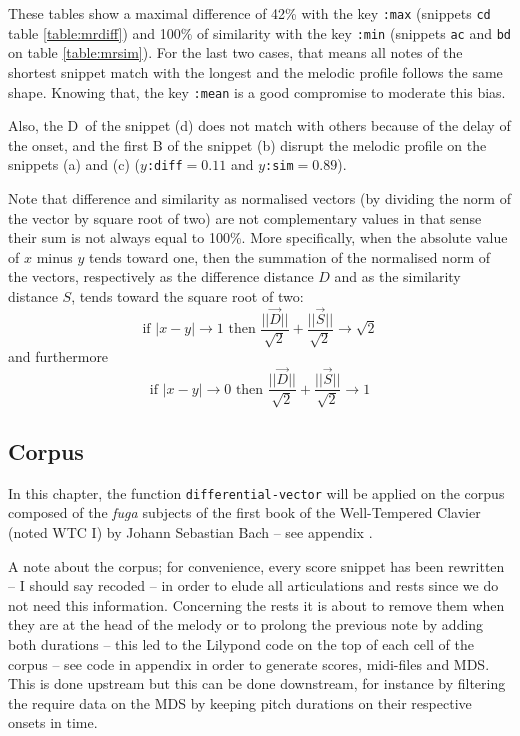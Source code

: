 These tables show a maximal difference of 42\% with the key \texttt{:max} (snippets \texttt{cd} table \ref{table:mrdiff}) and 100\% of similarity with the key \texttt{:min} (snippets \texttt{ac} and \texttt{bd} on table \ref{table:mrsim}).
For the last two cases, that means all notes of the shortest snippet match with the longest and the melodic profile follows the same shape. Knowing that, the key \texttt{:mean} is a good compromise to moderate this bias. 

Also, the \textsf{D}\sh \  of the snippet (d) does not match with others because of the delay of the onset, and the first \textsf{B} of the snippet (b) disrupt the melodic profile on the snippets (a) and (c) ($y$\texttt{:diff}$=0.11$ and $y$\texttt{:sim}$=0.89$).

Note that difference and similarity as normalised vectors (by dividing the norm of the vector by square root of two) are not complementary values in that sense their sum is not always equal to 100\%. More specifically, when the absolute value of $x$ minus $y$ tends toward one, then the summation of the normalised norm of the vectors, respectively as the difference distance $D$ and as the similarity distance $S$, tends toward the square root of two:
$$\text{if } |x-y| \to 1 \text{ then } \frac{||\overrightarrow{D}||}{\sqrt{2}} + \frac{||\overrightarrow{S}||}{\sqrt{2}} \to \sqrt{2}$$
 and furthermore
 $$\text{if } |x-y| \to 0 \text{ then } \frac{||\overrightarrow{D}||}{\sqrt{2}} + \frac{||\overrightarrow{S}||}{\sqrt{2}} \to 1$$
 
 \subsection{Corpus}
 
 In this chapter, the function \texttt{differential-vector} will be applied on the corpus composed of the \textit{fuga} subjects of the first book of the Well-Tempered Clavier (noted WTC I) by Johann Sebastian Bach -- see appendix .

\smallskip

A note about the corpus; for convenience, every score snippet has been rewritten -- I should say recoded -- in order to elude all articulations and rests since we do not need this information. Concerning the rests it is about to remove them when they are at the head of the melody or to prolong the previous note by adding both durations -- this led to the Lilypond code on the top of each cell of the corpus -- see code in appendix  in order to generate scores, midi-files and MDS. This is done upstream but this can be done downstream, for instance by filtering the require data on the MDS by keeping pitch durations on their respective onsets in time. 

